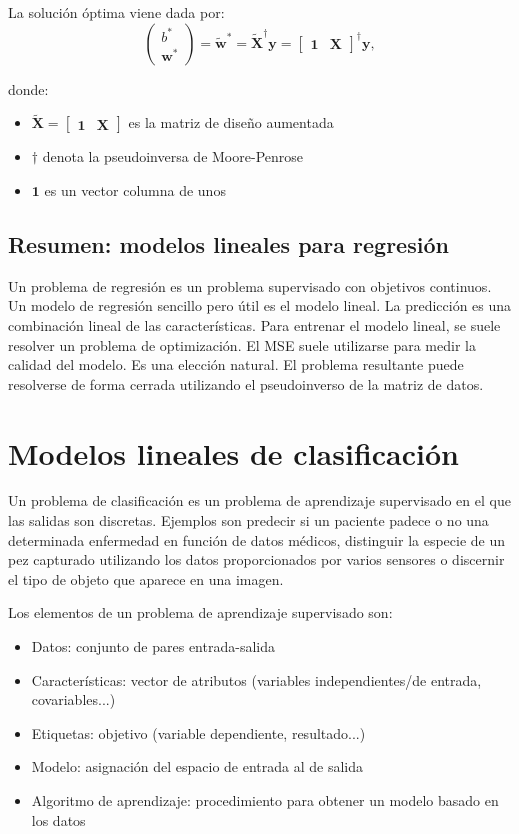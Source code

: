 La solución óptima viene dada por:
$$
\begin{pmatrix} b^* \\ \mathbf{w}^* \end{pmatrix} = 
\tilde{\mathbf{w}}^* = 
\tilde{\mathbf{X}}^{\dagger} \mathbf{y} = 
\begin{bmatrix} \mathbf{1} & \mathbf{X} \end{bmatrix}^{\dagger} \mathbf{y},
$$

donde:
\begin{itemize}
\item $\tilde{\mathbf{X}} = \begin{bmatrix} \mathbf{1} & \mathbf{X} \end{bmatrix}$ es la matriz de diseño aumentada
\item $\dagger$ denota la pseudoinversa de Moore-Penrose
\item $\mathbf{1}$ es un vector columna de unos
\end{itemize}

\subsection{Resumen: modelos lineales para regresión}
Un problema de regresión es un problema supervisado con objetivos continuos. Un modelo de regresión sencillo pero útil es el modelo lineal. La predicción es una combinación lineal de las características. Para entrenar el modelo lineal, se suele resolver un problema de optimización. El MSE suele utilizarse para medir la calidad del modelo. Es una elección natural. El problema resultante puede resolverse de forma cerrada utilizando el pseudoinverso de la matriz de datos.

\section{Modelos lineales de clasificación}
Un problema de clasificación es un problema de aprendizaje supervisado en el que las salidas son discretas. Ejemplos son predecir si un paciente padece o no una determinada enfermedad en función de datos médicos, distinguir la especie de un pez capturado utilizando los datos proporcionados por varios sensores o discernir el tipo de objeto que aparece en una imagen.

Los elementos de un problema de aprendizaje supervisado son:
\begin{itemize}
\item Datos: conjunto de pares entrada-salida
\item Características: vector de atributos (variables independientes/de entrada, covariables...)
\item Etiquetas: objetivo (variable dependiente, resultado...)
\item Modelo: asignación del espacio de entrada al de salida
\item Algoritmo de aprendizaje: procedimiento para obtener un modelo basado en los datos
\end{itemize}

